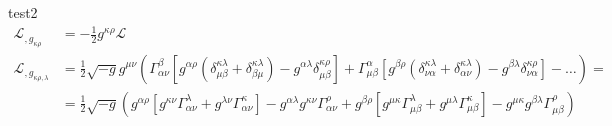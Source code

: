 \documentclass[a4paper,12pt]{article}
\newcommand{\kla}{}
\begin{document}
test2
\begin{align*}
\mathcal{L}_{,g_{\kappa\rho}}&=-\frac{1}{2} g^{\kappa\rho}\mathcal{L}\\
\mathcal{L}_{,g_{\kappa\rho,\lambda}}&=\frac{1}{2}\sqrt{-g}g^{\mu\nu}\kla\left( {\Gamma^\beta_{\alpha\nu}[g^{\alpha\rho}(\delta^{\kappa\lambda}_{\mu\beta}+\delta^{\kappa\lambda}_{\beta\mu})-g^{\alpha\lambda}\delta^{\kappa\rho}_{\mu\beta}]+\Gamma^\alpha_{\mu\beta}[g^{\beta\rho}(\delta^{\kappa\lambda}_{\nu\alpha}+\delta^{\kappa\lambda}_{\alpha\nu})-g^{\beta\lambda}\delta^{\kappa\rho}_{\nu\alpha}]-\dots} \right)=\\
&=\frac{1}{2}\sqrt{-g}\kla\left( {g^{\alpha\rho}[g^{\kappa\nu}\Gamma^\lambda_{\alpha\nu}+g^{\lambda\nu}\Gamma^\kappa_{\alpha\nu}]-g^{\alpha\lambda}g^{\kappa\nu}\Gamma^\rho_{\alpha\nu}+g^{\beta\rho}[g^{\mu\kappa}\Gamma^\lambda_{\mu\beta}+g^{\mu\lambda}\Gamma^\kappa_{\mu\beta}]-g^{\mu\kappa}g^{\beta\lambda}\Gamma^\rho_{\mu\beta}} \right)
\end{align*}







































\end{document}
